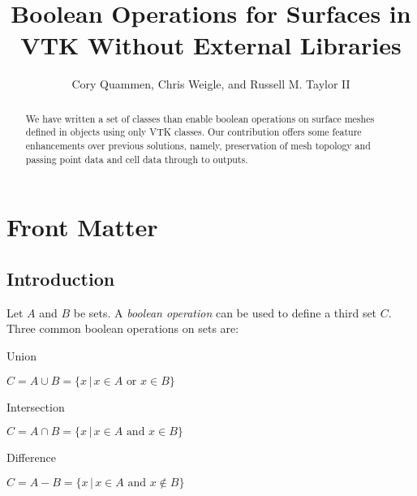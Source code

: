 \documentclass{InsightArticle}
\title{Boolean Operations for Surfaces in VTK Without External Libraries}
\author{Cory Quammen, Chris Weigle, and Russell M. Taylor II}
\newcommand{\IJhandlerIDnumber}{1338}
\begin{document}
%
% 
\IJhandlefooter{\IJhandlerIDnumber}


\ifpdf
\else
\fi


\maketitle


\ifhtml
\chapter*{Front Matter\label{front}}
\fi


\begin{abstract}
\noindent
We have written a set of classes than enable boolean operations on surface meshes defined in  objects using only VTK classes. Our contribution offers some feature enhancements over previous solutions, namely, preservation of mesh topology and passing point data and cell data through to outputs.

\end{abstract}

\IJhandlenote{\IJhandlerIDnumber}

\tableofcontents

\section{Introduction}

Let $A$ and $B$ be sets. A \emph{boolean operation} can be used to define a third set $C$. Three common boolean operations on sets are:

\begin{description}

\item Union

 $C = A \cup B = \{ x \, | \, x \in A \text{ or } x \in B \}$

\item Intersection

$C = A \cap B = \{ x \, | \, x \in A \text{ and } x \in B \}$

\item Difference

$C = A - B = \{ x \, | \, x \in A \text{ and } x \notin B \}$

\end{description}
\end{document}
